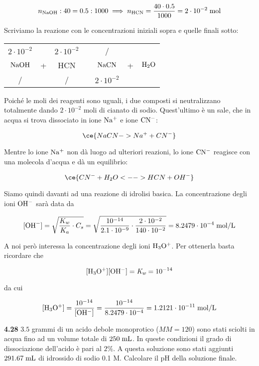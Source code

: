 $$n_{\rm NaOH}:40=0.5:1000
\implies
n_{\rm HCN}=\frac{40 \cdot 0.5}{1000}=2 \cdot 10^{-2} \; \rm mol$$

Scriviamo la reazione con le concentrazioni iniziali sopra e quelle finali sotto:

\begin{center}
    \begin{tabular}{ccccccc}
        $2 \cdot 10^{-2}$ &  & $2 \cdot 10^{-2}$ & & / &&\\
        $\rm NaOH$ & + & HCN & \ce{->} & $\rm NaCN$ & + & $\rm H_2O$\\
        / &  &  / & & $2 \cdot 10^{-2}$ &&\\
    \end{tabular}
\end{center}

Poiché le moli dei reagenti sono uguali, i due composti si neutralizzano totalmente dando $2 \cdot 10^{-2}$ moli di cianato di sodio. Quest'ultimo è un sale, che in acqua si trova dissociato in ione $\rm Na^+$ e ione $\rm CN^-$:

$$\ce{NaCN -> Na^+ + CN^-}$$

Mentre lo ione $\rm Na^+$ non dà luogo ad ulteriori reazioni, lo ione $\rm CN^-$ reagisce con una molecola d'acqua e dà un equilibrio:

$$\ce{CN^- + H_2O <--> HCN + OH^-}$$

Siamo quindi davanti ad una reazione di idrolisi basica. La concentrazione degli ioni $\rm OH^-$ sarà data da

$$[\text{OH}^-]
=\sqrt{\frac{K_w}{K_a}\cdot C_s}
=\sqrt{\frac{10^{-14}}{2.1 \cdot 10^{-9}} \cdot \frac{2 \cdot 10^{-2}}{140 \cdot 10^{-2}}}
=8.2479 \cdot 10^{-4} \; \rm mol/L$$

A noi però interessa la concentrazione degli ioni $\rm H_3O^+$. Per ottenerla basta ricordare che

$$\rm [H_3O^+][OH^-]=\textit{K}_{\textit{w}}=10^{-14}$$

da cui

$$\rm [H_3O^+]
=\frac{10^{-14}}{[OH^-]}
=\frac{10^{-14}}{8.2479 \cdot 10^{-4}}=1.2121 \cdot 10^{-11} \; \rm mol/L$$

\vspace{0.2cm}\textbf{4.28} $3.5$ grammi di un acido debole monoprotico ($MM=120$) sono stati sciolti in acqua fino ad un volume totale di $250 \; \rm mL$. In queste condizioni il grado di dissociazione dell'acido è pari al $2\%$. A questa soluzione sono stati aggiunti $291.67 \; \rm mL$ di idrossido di sodio 0.1 M. Calcolare il pH della soluzione finale.

